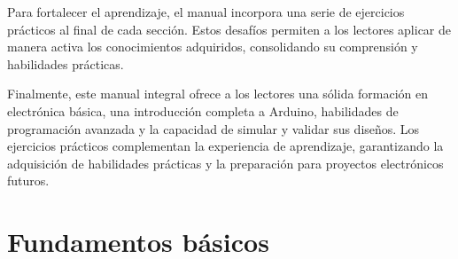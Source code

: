 \documentclass[a4paper,11pt]{report}    %
\begin{document}
Para fortalecer el aprendizaje, el manual incorpora una serie de ejercicios prácticos al final de cada sección. Estos desafíos permiten a los lectores aplicar de manera activa los conocimientos adquiridos, consolidando su comprensión y habilidades prácticas.

Finalmente, este manual integral ofrece a los lectores una sólida formación en electrónica básica, una introducción completa a Arduino, habilidades de programación avanzada y la capacidad de simular y validar sus diseños. Los ejercicios prácticos complementan la experiencia de aprendizaje, garantizando la adquisición de habilidades prácticas y la preparación para proyectos electrónicos futuros.



\newpage
\hypersetup{pageanchor=true}
\setcounter{page}{1}
\tableofcontents


\glsaddall  %
\printglossaries

\newpage
\printnomenclature


\newpage
\listoffigures

\newpage
\listoftables

\newpage
\listofmyequations

\lstlistoflistings

\newpage
\printindex

\newpage
\printbibliography[heading=bibintoc]




\newpage
\chapter{Fundamentos básicos}
\end{document}
